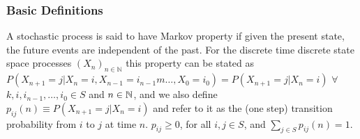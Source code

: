 \subsubsection*{Basic Definitions}
 A stochastic process is said to have Markov property if given the present state, the future events are independent of the past. For the discrete time discrete state space processes $(X_n)_{n \in \mathbb{N}}$ this property can be stated as $P(X_{n+1} = j | X_{n} = i, X_{n-1} = i_{n-1}m \ldots, X_{0} = i_{0}) = P(X_{n+1} = j | X_{n}=i)$ $\forall$ $k,i,i_{n-1},\ldots,i_0 \in S$ and $n \in \mathbb{N}$, and we also define $p_{ij}(n) \equiv P(X_{n+1} = j | X_n = {i})$ and refer to it as the (one step) transition probability from $i$ to $j$ at time $n$.
 $p_{ij} \ge 0$, for all $i,j \in S$, and $\sum_{j \in S} p_{ij}(n) = 1$.